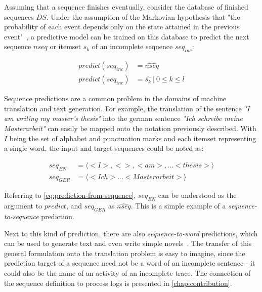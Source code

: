Assuming that a sequence finishes eventually, consider the database of finished sequences $DS$. Under the assumption of the Markovian hypothesis that "the probability of each event depends only on the state attained in the previous event"~\cite{gagniuc2017markov}, a predictive model can be trained on this database to predict the next sequence $nseq$ or itemset $s_k$ of an incomplete sequence $seq_{inc}$:

\begin{equation}
\begin{split}
    predict(seq_{inc}) &= \widehat{nseq}\\
    predict(seq_{inc}) &= \hat{s_k}\ |\ 0 \leq k \leq l
\end{split}
\label{eq:prediction-from-sequence}
\end{equation}

Sequence predictions are a common problem in the domains of machine translation and text generation. For example, the translation of the sentence \textit{"I am writing my master's thesis"} into the german sentence \textit{"Ich schreibe meine Masterarbeit"} can easily be mapped onto the notation previously described. With $I$ being the set of alphabet and punctuation marks and each itemset representing a single word, the input and target sequences could be noted as:

\begin{equation*}
\begin{split}
seq_{EN} &= \langle<I>, < >, <am>, ... <thesis>\rangle\\
seq_{GER} &= \langle<Ich> ... <Masterarbeit>\rangle
\end{split}
\end{equation*}

Referring to \autoref{eq:prediction-from-sequence}, $seq_{EN}$ can be understood as the argument to $predict$, and $seq_{GER}$ as $\widehat{nseq}$. This is a simple example of a \textit{sequence-to-sequence} prediction.

Next to this kind of prediction, there are also \textit{sequence-to-word} predictions, which can be used to generate text and even write simple novels~\cite{web:text-generation-machinelearningmastery, web:text-generation-freecodecamp}. The transfer of this general formulation onto the translation problem is easy to imagine, since the prediction target of a sequence need not be a word of an incomplete sentence - it could also be the name of an activity of an incomplete trace. The connection of the sequence definition to process logs is presented in \autoref{chap:contribution}.

